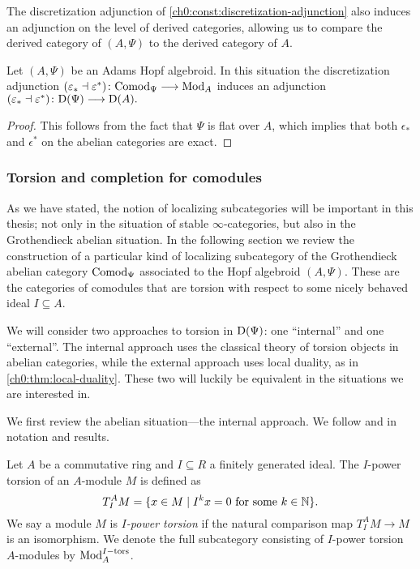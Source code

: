 The discretization adjunction of \cref{ch0:const:discretization-adjunction} also induces an adjunction on the level of derived categories, allowing us to compare the derived category of $(A, \Psi)$ to the derived category of $A$. 

\begin{proposition}
    Let $(A,\Psi)$ be an Adams Hopf algebroid. In this situation the discretization adjunction $(\varepsilon_*\dashv \varepsilon^*)\colon \mathrm{Comod}_\Psi\longrightarrow \mathrm{Mod}_A$ induces an adjunction $(\varepsilon_*\dashv \varepsilon^*)\colon \mathrm{D}(\Psi)\longrightarrow \mathrm{D}(A).$
\end{proposition}
\begin{proof}
    This follows from the fact that $\Psi$ is flat over $A$, which implies that both $\epsilon_*$ and $\epsilon^*$ on the abelian categories are exact. 
\end{proof}




\subsubsection{Torsion and completion for comodules}
\label{ch0:sssec:torsion-and-completion-for-comodules}

As we have stated, the notion of localizing subcategories will be important in this thesis; not only in the situation of stable $\infty$-categories, but also in the Grothendieck abelian situation. In the following section we review the construction of a particular kind of localizing subcategory of the Grothendieck abelian category $\mathrm{Comod}_\Psi$ associated to the Hopf algebroid $(A,\Psi)$. These are the categories of comodules that are torsion with respect to some nicely behaved ideal $I\subseteq A$. 

We will consider two approaches to torsion in $\mathrm{D}(\Psi)$: one ``internal'' and one ``external''. The internal approach uses the classical theory of torsion objects in abelian categories, while the external approach uses local duality, as in \cref{ch0:thm:local-duality}. These two will luckily be equivalent in the situations we are interested in. 

We first review the abelian situation---the internal approach. We follow \cite{barthel-heard-valenzuela_2018} and \cite{barthel-heard-valenzuela_2020} in notation and results. 

\begin{definition}
    \label{def:I-power-torsion-module}
    Let $A$ be a commutative ring and $I\subseteq R$ a finitely generated ideal. The $I$-power torsion of an $A$-module $M$ is defined as
    \[T_I^A M = \{x\in M \mid I^k x = 0 \text{ for some } k\in \mathbb{N}\}.\]
    We say a module $M$ is \emph{$I$-power torsion} if the natural comparison map $T_I^A M\longrightarrow M$ is an isomorphism. We denote the full subcategory consisting of $I$-power torsion $A$-modules by $\mathrm{Mod}_A^{I-\mathrm{tors}}$. 
\end{definition}

